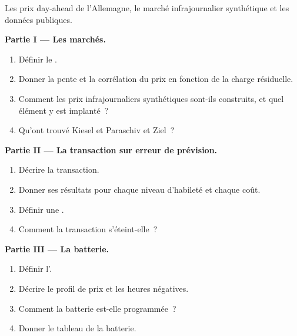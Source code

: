 \begin{problem}\label{pb:s2:power-and-gas-trading:1}
Les prix day-ahead de l'Allemagne, le marché infrajournalier synthétique et les données publiques.

\medskip\noindent\textbf{Partie I --- Les marchés.}
\begin{enumerate}
\item Définir le .
\item Donner la pente et la corrélation du prix en fonction de la charge résiduelle.
\item Comment les prix infrajournaliers synthétiques sont-ils construits, et quel élément y est implanté~?
\item Qu'ont trouvé Kiesel et Paraschiv et Ziel~?
\end{enumerate}

\medskip\noindent\textbf{Partie II --- La transaction sur erreur de prévision.}
\begin{enumerate}[resume]
\item Décrire la transaction.
\item Donner ses résultats pour chaque niveau d'habileté et chaque coût.
\item Définir une .
\item Comment la transaction s'éteint-elle~?
\end{enumerate}

\medskip\noindent\textbf{Partie III --- La batterie.}
\begin{enumerate}[resume]
\item Définir l'.
\item Décrire le profil de prix et les heures négatives.
\item Comment la batterie est-elle programmée~?
\item Donner le tableau de la batterie.
\end{enumerate}


\end{problem}
